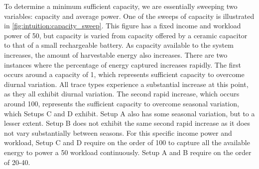 To determine a minimum sufficient capacity, we are essentially sweeping two variables: capacity and average power.
One of the sweeps of capacity is illustrated in \cref{fig:intuition:capacity_sweep}.
This figure has a fixed income and workload power of 50\ssi{\micro\watt}, but capacity is varied from capacity offered by a ceramic capacitor to that of a small rechargeable battery.
As capacity available to the system increases, the amount of harvestable energy also increases.
There are two instances where the percentage of energy captured increases rapidly. The first occurs around a capacity of 1\ssi{\milli\Wh}, which represents sufficient capacity to overcome diurnal variation. All trace types experience a substantial increase at this point, as they all exhibit diurnal variation.
The second rapid increase, which occurs around 100\ssi{\milli\Wh}, represents the sufficient capacity to overcome seasonal variation, which Setups C and D exhibit. Setup A also has some seasonal variation, but to a lesser extent. Setup B does not exhibit the same second rapid increase as it does not vary substantially between seasons.
For this specific income power and workload, Setup C and D require on the order of 100\ssi{\milli\Wh} to capture all the available energy to power a 50\ssi{\micro\watt} workload continuously. Setup A and B require on the order of 20-40\ssi{\milli\Wh}.


